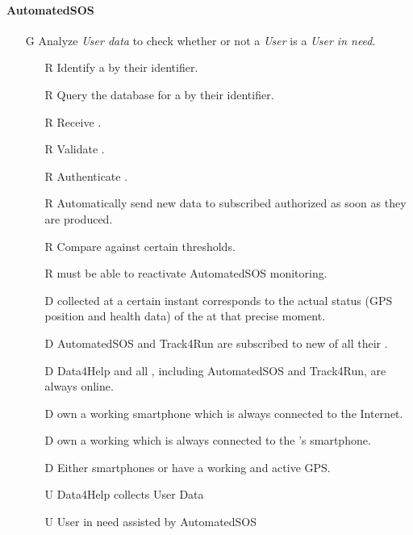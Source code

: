 \documentclass[../../../rasd.tex]{subfiles}
\begin{document}
\paragraph{AutomatedSOS}
\begin{itemize}
    \item[G\subs{6}]Analyze \textit{User data} to check whether or not a \textit{User} is a \textit{User in need}.
    \begin{itemize}
        \item[R\subs{6}]Identify a  by their identifier.
        \item[R\subs{7}]Query the database for a  by their identifier.
        \item[R\subs{8}]Receive .
        \item[R\subs{9}]Validate .
        \item[R\subs{10}]Authenticate .
        \item[R\subs{29}]Automatically send new data to subscribed authorized  as soon as they are produced.
        \item[R\subs{36}]Compare  against certain thresholds.
        \item[R\subs{38}] must be able to reactivate AutomatedSOS monitoring.
        \\
        \item[D\subs{2}] collected at a certain instant corresponds to the actual status (GPS position and health data) of the  at that precise moment.              
        \item[D\subs{6}]AutomatedSOS and Track4Run are subscribed to new  of all their .
        \item[D\subs{9}]Data4Help and all , including AutomatedSOS and Track4Run, are always online.
        \item[D\subs{10}] own a working smartphone which is always connected to the Internet.
        \item[D\subs{11}] own a working  which is always connected to the 's smartphone.
        \item[D\subs{12}]Either smartphones or  have a working and active GPS.
        \\
        \item[U\subs{5}]Data4Help collects User Data
        \item[U\subs{12}]User in need assisted by AutomatedSOS
    \end{itemize}


\end{itemize}
\end{document}
